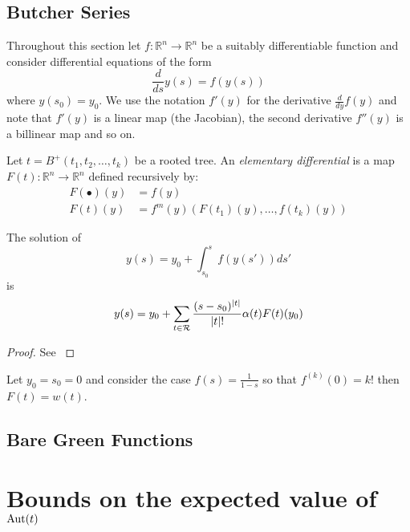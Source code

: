  \subsection{Butcher Series}
 Throughout this section let $f: \mathbb{R}^n \rightarrow \mathbb{R}^n$ be a suitably differentiable function and consider differential equations of the form 
 \[
  \frac{d}{ds}{y(s)} = f(y(s))
 \]
where $y(s_0) = y_0$.  We use the notation $f'(y)$ for the derivative $\frac{d}{dy}f(y)$ and note that $f'(y)$ is a linear map (the Jacobian), the second derivative $f''(y)$ is a billinear map and so on. 

\begin{defn}
Let $t = B^{+}(t_1,t_2,\dots,t_k)$ be  a rooted tree. An \emph{elementary differential} is a map  $F(t):  \mathbb{R}^n \rightarrow \mathbb{R}^n$ defined 
recursively by:
\begin{align}
 F(\bullet)(y) &= f(y) \\%
 F(t)(y) &= f^{m}(y)(F(t_1)(y),\dots,f(t_k)(y))
 \end{align}
\end{defn}
\begin{theorem}
 The solution of 
 \[
  y(s) = y_0 + \int_{s_0}^{s} f(y(s')) ds'
 \]
is
\[
 y(s) = y_0 + \sum_{t \in \operatorname{\mathcal{R}}} \frac{(s-s_0)^{\lvert t \rvert}}{\lvert t \rvert !}\alpha(t)F(t)(y_0)
\]
\end{theorem}

\begin{proof}
 See \cite{Butcher,Brouder}
\end{proof}

\begin{ex}
 Let $y_0 = s_0 = 0$  and consider the case $f(s) = \frac{1}{1-s}$ so that  $f^{(k)}(0) = k!$ then $F(t) = w(t)$.
\end{ex}

\subsection{Bare Green Functions}

\section{Bounds on the expected value of $\operatorname{Aut}(t)$}


